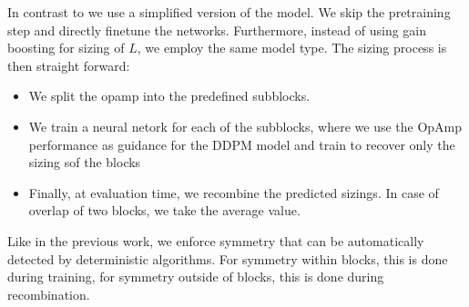 \documentclass[conference]{IEEEtran}
\begin{document}
	In contrast to \cite{ leibl24inverse} we use a simplified version of the model. We skip the pretraining step and directly finetune the networks. Furthermore, instead of using gain boosting for sizing of $L$, we employ the same model type.
	The sizing process is then straight forward:
	\begin{itemize}
	\item We split the opamp into the predefined subblocks.
	\item We train a neural netork for each of the subblocks, where we use the OpAmp performance as guidance for the DDPM model and train to recover only the sizing sof the blocks
	\item Finally, at evaluation time, we recombine the predicted sizings. In case of overlap of two blocks, we take the average value.
	\end{itemize}
	Like in the previous work, we enforce symmetry that can be automatically detected by deterministic algorithms. For symmetry within blocks, this is done during training, for symmetry outside of blocks, this is done during recombination.
			
		
\end{document}
